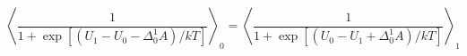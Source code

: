 


\[ \left< \frac{1}{1 + \exp\left[\left(U_1 - U_0 - \Delta_0^1A \right) /kT \right]} \right>_0 = \left< \frac{1}{1 + \exp\left[\left(U_0 - U_1 + \Delta_0^1A \right) /kT \right]} \right>_1 \]


